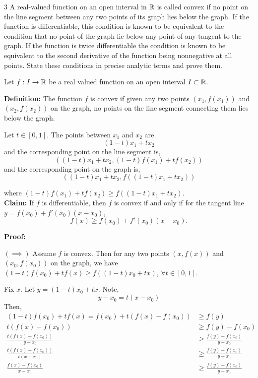 \documentclass[12pt]{article}
\begin{document}
\newpage

\begin{problem}{3}
    A real-valued function on an open interval in $\mathbb R$ is called convex if no point on the line segment between any two points of its graph lies below the graph. If the function is differentiable, this condition is known to be equivalent to the condition that no point of the graph lie below any point of any tangent to the graph. If the function is twice differentiable the condition is known to be equivalent to the second derivative of the function being nonnegative at all points. State these conditions in precise analytic terms and prove them.
\end{problem}

\begin{solution}
    \bbni
    
    Let $f: I \to \mathbb R$ be a real valued function on an open interval $I \subset \mathbb R$.

    \textbf{Definition:}
        The function $f$ is convex if given any two points $(x_1, f(x_1))$ and $(x_2, f(x_2))$ on the graph, no points on the line segment connecting them lies below the graph. 
        
        Let $t \in [0,1]$. The points between $x_1$ and $x_2$ are 
        \[(1-t)x_1 + tx_2\] 
        and the corresponding point on the line segment is, 
        \[((1-t)x_1 + tx_2, (1-t)f(x_1)+tf(x_2))\]
        and the corresponding point on the graph is, 
        \[((1-t)x_1 + tx_2, f((1-t)x_1 + tx_2))\]

        where $(1-t)f(x_1)+tf(x_2) \geq f((1-t)x_1+ tx_2)$. 
        \\
        \newpage
        \textbf{Claim:} If $f$ is differentiable, then $f$ is convex if and only if for the tangent line $y = f(x_0) + f'(x_0)(x-x_0)$, 
        \[f(x) \geq f(x_0) + f'(x_0)(x-x_0). \]
        
        \textbf{Proof:} 
        
        $(\implies)$
        Assume $f$ is convex. Then for any two points $(x, f(x))$ and $(x_0, f(x_0))$ on the graph, we have $(1-t)f(x_0)+tf(x) \geq f((1-t)x_0+ tx)$, $\forall t \in [0,1]$.
        
        Fix $x$. Let $y= (1-t)x_0 + tx$. Note, 
        \[y - x_0 = t(x -x_0)\] 
        Then, 
        \begin{align*}
            (1-t)f(x_0)+tf(x) = f(x_0) + t(f(x) - f(x_0)) &\geq f(y) \\ 
           t(f(x) - f(x_0))  &\geq f(y) - f(x_0)\\ 
            \frac{t(f(x) - f(x_0)) }{y - x_0}&\geq \frac{f(y) - f(x_0)}{y-x_0}\\ 
            \frac{t(f(x) - f(x_0))  }{t(x - x_0)}&\geq \frac{f(y) - f(x_0)}{y-x_0}\\ 
            \frac{f(x) - f(x_0)  }{x - x_0}&\geq \frac{f(y) - f(x_0)}{y-x_0}
        \end{align*}
        

\end{solution}
\end{document}
